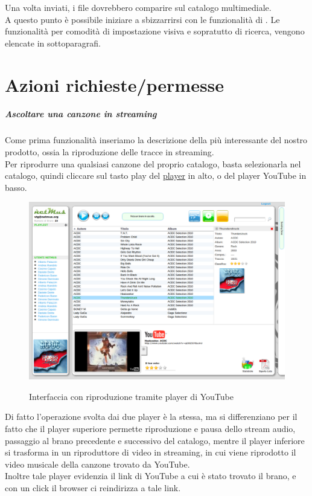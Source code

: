 Una volta inviati, i file dovrebbero comparire sul catalogo multimediale.\\
A questo punto \`e possibile iniziare a sbizzarrirsi con le funzionalit\`a di
. Le funzionalit\`a per comodit\`a di impostazione visiva e
sopratutto di ricerca, vengono elencate in sottoparagrafi.

\section{Azioni richieste/permesse}

\subparagraph{Ascoltare una canzone in streaming}

Come prima funzionalit\`a inseriamo la descrizione della pi\`u interessante
del nostro prodotto, ossia la riproduzione delle tracce in streaming.\\ Per
riprodurre una qualsiasi canzone del proprio catalogo, basta selezionarla nel
catalogo, quindi cliccare sul tasto play del \underline{player} in alto, o del
player YouTube in basso.\\
\begin{figure}[htbp]
  \centering
  \includegraphics[width=15cm]{img/MU/player_youtube.png}\\
\caption{Interfaccia con riproduzione tramite player di YouTube}
\end{figure} 

Di fatto l'operazione svolta dai due player \`e la stessa, ma
si differenziano per il fatto che il player superiore permette riproduzione e
pausa dello stream audio, passaggio al brano precedente e successivo del catalogo, mentre il player
inferiore si trasforma in un riproduttore di video in streaming, in cui viene
riprodotto il video musicale della canzone trovato da YouTube.\\
Inoltre tale player evidenzia il link di YouTube a cui \`e stato trovato il
brano, e con un click il browser ci reindirizza a tale link.

